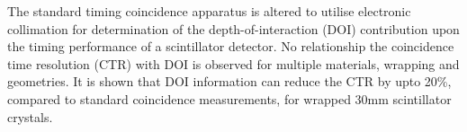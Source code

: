 The standard timing coincidence apparatus is altered to utilise electronic collimation for determination of the depth-of-interaction (DOI) contribution upon the timing performance of a scintillator detector. No relationship the coincidence time resolution (CTR) with DOI is observed for multiple materials, wrapping and geometries. It is shown that DOI information can reduce the CTR by upto 20\%, compared to standard coincidence measurements, for wrapped 30mm scintillator crystals.